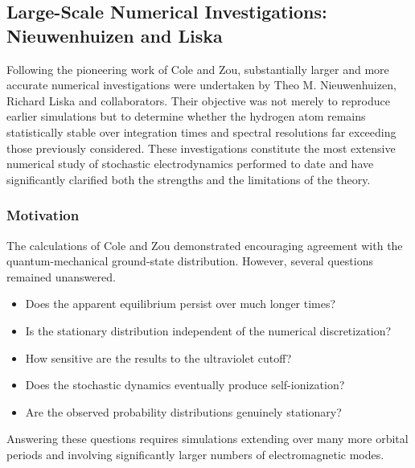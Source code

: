 \subsection{Large-Scale Numerical Investigations:
Nieuwenhuizen and Liska}
\label{sec:Nieuwenhuizen}
Following the pioneering work of Cole and Zou, substantially larger and
more accurate numerical investigations were undertaken by Theo M.
Nieuwenhuizen, Richard Liska and collaborators. Their objective was not
merely to reproduce earlier simulations but to determine whether the
hydrogen atom remains statistically stable over integration times and
spectral resolutions far exceeding those previously considered.
These investigations constitute the most extensive numerical study of
stochastic electrodynamics performed to date and have significantly
clarified both the strengths and the limitations of the theory.
\subsubsection{Motivation}
The calculations of Cole and Zou demonstrated encouraging agreement
with the quantum-mechanical ground-state distribution. However, several
questions remained unanswered.
\begin{itemize}
\item
Does the apparent equilibrium persist over much longer times?
\item
Is the stationary distribution independent of the numerical
discretization?
\item
How sensitive are the results to the ultraviolet cutoff?
\item
Does the stochastic dynamics eventually produce self-ionization?
\item
Are the observed probability distributions genuinely stationary?
\end{itemize}
Answering these questions requires simulations extending over many more
orbital periods and involving significantly larger numbers of
electromagnetic modes.
